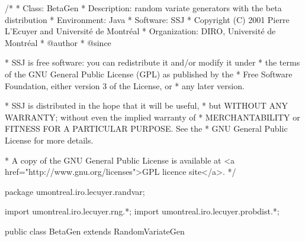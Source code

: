 \begin{code}
\begin{hide}
/*
 * Class:        BetaGen
 * Description:  random variate generators with the beta distribution
 * Environment:  Java
 * Software:     SSJ 
 * Copyright (C) 2001  Pierre L'Ecuyer and Université de Montréal
 * Organization: DIRO, Université de Montréal
 * @author       
 * @since

 * SSJ is free software: you can redistribute it and/or modify it under
 * the terms of the GNU General Public License (GPL) as published by the
 * Free Software Foundation, either version 3 of the License, or
 * any later version.

 * SSJ is distributed in the hope that it will be useful,
 * but WITHOUT ANY WARRANTY; without even the implied warranty of
 * MERCHANTABILITY or FITNESS FOR A PARTICULAR PURPOSE.  See the
 * GNU General Public License for more details.

 * A copy of the GNU General Public License is available at
   <a href="http://www.gnu.org/licenses">GPL licence site</a>.
 */
\end{hide}
package umontreal.iro.lecuyer.randvar;\begin{hide}
import umontreal.iro.lecuyer.rng.*;
import umontreal.iro.lecuyer.probdist.*;
\end{hide}

public class BetaGen extends RandomVariateGen \begin{hide} {
    
   // Distribution parameters
   protected double p;
   protected double q;
   protected double a;
   protected double b;
   protected int gen;
\end{hide}
\end{code}


